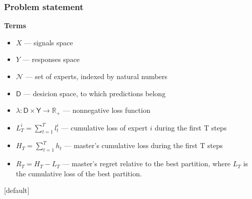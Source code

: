 \documentclass{beamer}
\begin{document}
\begin{frame}
\frametitle{Problem statement}

\textbf{Terms}
\begin{itemize}
\item $X$ --- signals space
\item $Y$ --- responses space
\item $\mathcal{N}$ --- set of experts, indexed by natural numbers \\
\item $\mathsf{D}$ --- desicion space, to which predictions belong \\
\item $\lambda: \mathsf{D} \times \mathsf{Y} \rightarrow \mathbb{R}_+$ --- nonnegative loss function \\

\item $L^i_T = \sum\limits_{t = 1}^T l^i_t$ --- cumulative loss of expert $i$ during the first T steps \\
\item $H_T = \sum\limits_{t = 1}^T h_t$ --- master's cumulative loss during the first T steps \\
\item $R_T= H_T - L_T$ --- master's regret relative to the best partition, where $L_T$ is the cumulative loss of the best partition. 
\end{itemize}


\end{frame}


[default]
\end{document}
